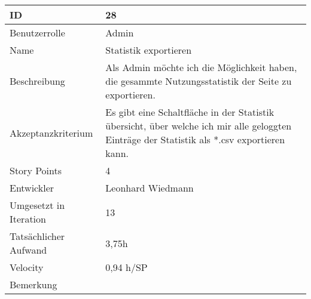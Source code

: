 \begin{tabularx}{\textwidth}{|p{}|X|}
	\hline
	ID & 28 \\
	\hline
	Benutzerrolle & Admin \\
	\hline
	Name & Statistik exportieren\\
	\hline
	Beschreibung & Als Admin möchte ich die Möglichkeit haben, die gesammte Nutzungsstatistik der Seite zu exportieren. \\
	\hline
	Akzeptanzkriterium & Es gibt eine Schaltfläche in der Statistik übersicht, über welche ich mir alle geloggten Einträge der Statistik als *.csv exportieren kann. \\
	\hline
	Story Points & 4 \\
	\hline
	Entwickler & Leonhard Wiedmann \\
	\hline
	Umgesetzt in Iteration & 13 \\
	\hline
	Tatsächlicher Aufwand & 3,75h \\
	\hline
	Velocity & 0,94 h/SP\\
	\hline
	Bemerkung & \\
	\hline
\end{tabularx}
\vspace{20pt}

